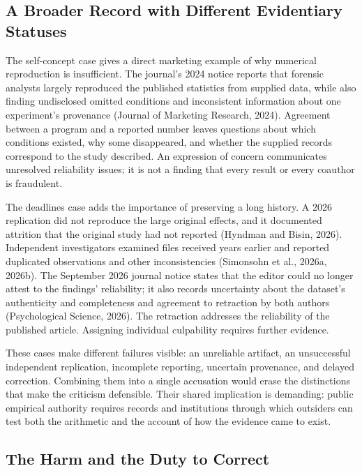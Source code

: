 \hypertarget{M09-a-broader-record-with-different-evidentiary-statuses}{%
\subsection{A Broader Record with Different Evidentiary
Statuses}\label{M09-a-broader-record-with-different-evidentiary-statuses}}

\noindent \noindent The self-concept case gives a direct marketing example of why
numerical reproduction is insufficient. The journal's 2024 notice
reports that forensic analysts largely reproduced the published
statistics from supplied data, while also finding undisclosed omitted
conditions and inconsistent information about one experiment's
provenance (Journal of Marketing Research, 2024). Agreement between a
program and a reported number leaves questions about which conditions
existed, why some disappeared, and whether the supplied records
correspond to the study described. An expression of concern communicates
unresolved reliability issues; it is not a finding that every result or
every coauthor is fraudulent.

The deadlines case adds the importance of preserving a long history. A
2026 replication did not reproduce the large original effects, and it
documented attrition that the original study had not reported (Hyndman
and Bisin, 2026). Independent investigators examined files received
years earlier and reported duplicated observations and other
inconsistencies (Simonsohn et al., 2026a, 2026b). The September 2026
journal notice states that the editor could no longer attest to the
findings' reliability; it also records uncertainty about the dataset's
authenticity and completeness and agreement to retraction by both
authors (Psychological Science, 2026). The retraction addresses the
reliability of the published article. Assigning individual culpability
requires further evidence.

These cases make different failures visible: an unreliable artifact, an
unsuccessful independent replication, incomplete reporting, uncertain
provenance, and delayed correction. Combining them into a single
accusation would erase the distinctions that make the criticism
defensible. Their shared implication is demanding: public empirical
authority requires records and institutions through which outsiders can
test both the arithmetic and the account of how the evidence came to
exist.

\hypertarget{M09-the-harm-and-the-duty-to-correct}{%
\subsection{The Harm and the Duty to
Correct}\label{M09-the-harm-and-the-duty-to-correct}}

